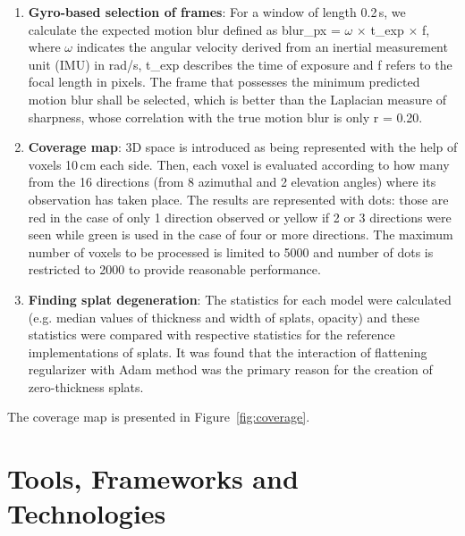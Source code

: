 \begin{enumerate}
    \item \textbf{Gyro-based selection of frames}: For a window of length 0.2\,s, we calculate the expected motion blur defined as blur\_px = $\omega$ $\times$ t\_exp $\times$ f, where $\omega$ indicates the angular velocity derived from an inertial measurement unit (IMU) in rad/s, t\_exp describes the time of exposure and f refers to the focal length in pixels. The frame that possesses the minimum predicted motion blur shall be selected, which is better than the Laplacian measure of sharpness, whose correlation with the true motion blur is only r = 0.20.

    \item \textbf{Coverage map}: 3D space is introduced as being represented with the help of voxels 10\,cm each side. Then, each voxel is evaluated according to how many from the 16 directions (from 8 azimuthal and 2 elevation angles) where its observation has taken place. The results are represented with dots: those are red in the case of only 1 direction observed or yellow if 2 or 3 directions were seen while green is used in the case of four or more directions. The maximum number of voxels to be processed is limited to 5000 and number of dots is restricted to 2000 to provide reasonable performance.

    \item \textbf{Finding splat degeneration}: The statistics for each model were calculated (e.g. median values of thickness and width of splats, opacity) and these statistics were compared with respective statistics for the reference implementations of splats. It was found that the interaction of flattening regularizer with Adam method was the primary reason for the creation of zero-thickness splats.
\end{enumerate}

The coverage map is presented in Figure~\ref{fig:coverage}.

\section{Tools, Frameworks and Technologies}

